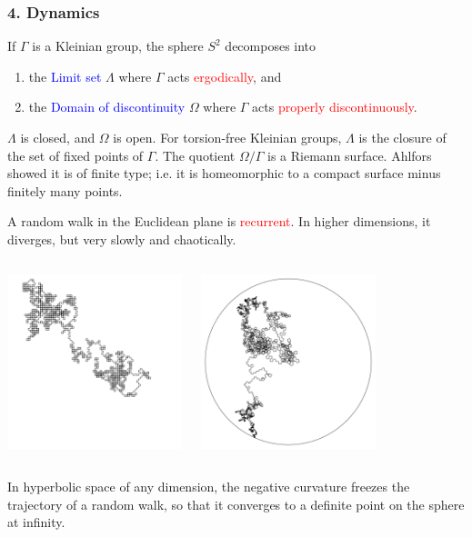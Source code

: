 \documentclass{beamer}
\begin{document}
\frame
{
\frametitle{4. Dynamics}
If $\Gamma$ is a Kleinian group, the sphere $S^2$ decomposes into 
\begin{enumerate}
\item{the \textcolor{blue}{Limit set} 
$\Lambda$ where $\Gamma$ acts \textcolor{red}{ergodically}, and}
\item{the \textcolor{blue}{Domain of discontinuity}
$\Omega$ where $\Gamma$ acts \textcolor{red}{properly discontinuously}.}
\end{enumerate}
$\Lambda$ is closed, and $\Omega$ is open. For torsion-free 
Kleinian groups, $\Lambda$ is the closure of the set of fixed points of $\Gamma$.
\vskip 10pt
The quotient $\Omega/\Gamma$ is a Riemann surface. Ahlfors showed it is of
\textcolor{dgreen}{finite type}; i.e.\/ it is homeomorphic to a compact surface
minus finitely many points.
}
\frame
{
A random walk in the Euclidean plane is \textcolor{red}{recurrent}. In higher dimensions, it diverges, but
very slowly and chaotically.
\begin{columns}[c]
\column{2in}
\begin{center}
\includegraphics[width=2in]{turtle_Euclid.png}
\end{center}
\column{2in}
\begin{center}
\includegraphics[width=2in]{turtle_hyperbolic.png}
\end{center}
\end{columns}
In hyperbolic space of any dimension, the negative curvature \textcolor{dgreen}{freezes} 
the trajectory of a random walk, so that it converges to a definite point on the sphere
at infinity.
}
\end{document}
